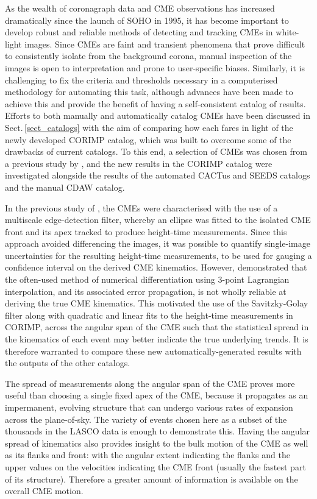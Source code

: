 \documentclass[referee,a4paper,12pt,traditabstract]{swsc}
\begin{document}
\begin{linenumbers}
As the wealth of coronagraph data and CME observations has increased dramatically since the launch of SOHO in 1995, it has become important to develop robust and reliable methods of detecting and tracking CMEs in white-light images. Since CMEs are faint and transient phenomena that prove difficult to consistently isolate from the background corona, manual inspection of the images is open to interpretation and prone to user-specific biases. Similarly, it is challenging to fix the criteria and thresholds necessary in a computerised methodology for automating this task, although advances have been made to achieve this and provide the benefit of having a self-consistent catalog of results. Efforts to both manually and automatically catalog CMEs have been discussed in Sect.\,\ref{sect_catalogs} with the aim of comparing how each fares in light of the newly developed CORIMP catalog, which was built to overcome some of the drawbacks of current catalogs. To this end, a selection of CMEs was chosen from a previous study by \cite{2009A&A...495..325B}, and the new results in the CORIMP catalog were investigated alongside the results of the automated CACTus and SEEDS catalogs and the manual CDAW catalog. 

In the previous study of \cite{2009A&A...495..325B}, the CMEs were characterised with the use of a multiscale edge-detection filter, whereby an ellipse was fitted to the isolated CME front and its apex tracked to produce height-time measurements. Since this approach avoided differencing the images, it was possible to quantify single-image uncertainties for the resulting height-time measurements, to be used for gauging a confidence interval on the derived CME kinematics. However, \cite{2013A&A...557A..96B} demonstrated that the often-used method of numerical differentiation using 3-point Lagrangian interpolation, and its associated error propagation, is not wholly reliable at deriving the true CME kinematics. This motivated the use of the Savitzky-Golay filter along with quadratic and linear fits to the height-time measurements in CORIMP, across the angular span of the CME such that the statistical spread in the kinematics of each event may better indicate the true underlying trends. It is therefore warranted to compare these new automatically-generated results with the outputs of the other catalogs.

The spread of measurements along the angular span of the CME proves more useful than choosing a single fixed apex of the CME, because it propagates as an impermanent, evolving structure that can undergo various rates of expansion across the plane-of-sky. The variety of events chosen here as a subset of the thousands in the LASCO data is enough to demonstrate this. Having the angular spread of kinematics also provides insight to the bulk motion of the CME as well as its flanks and front: with the angular extent indicating the flanks and the upper values on the velocities indicating the CME front (usually the fastest part of its structure). Therefore a greater amount of information is available on the overall CME motion.


\end{linenumbers}
\end{document}
